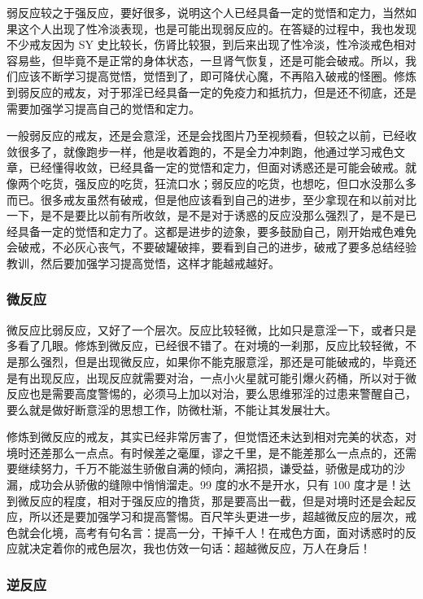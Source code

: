 \documentclass{ctexart}
\begin{document}
弱反应较之于强反应，要好很多，说明这个人已经具备一定的觉悟和定力，当然如果这个人出现了性冷淡表现，也是可能出现弱反应的。在答疑的过程中，我也发现不少戒友因为 SY 史比较长，伤肾比较狠，到后来出现了性冷淡，性冷淡戒色相对容易些，但毕竟不是正常的身体状态，一旦肾气恢复，还是可能会破戒。所以，我们应该不断学习提高觉悟，觉悟到了，即可降伏心魔，不再陷入破戒的怪圈。修炼到弱反应的戒友，对于邪淫已经具备一定的免疫力和抵抗力，但是还不彻底，还是需要加强学习提高自己的觉悟和定力。

一般弱反应的戒友，还是会意淫，还是会找图片乃至视频看，但较之以前，已经收敛很多了，就像跑步一样，他是收着跑的，不是全力冲刺跑，他通过学习戒色文章，已经懂得收敛，已经具备一定的觉悟和定力，但面对诱惑还是可能会破戒。就像两个吃货，强反应的吃货，狂流口水；弱反应的吃货，也想吃，但口水没那么多而已。很多戒友虽然有破戒，但是他应该看到自己的进步，至少拿现在和以前对比一下，是不是要比以前有所收敛，是不是对于诱惑的反应没那么强烈了，是不是已经具备一定的觉悟和定力了。这都是进步的迹象，要多鼓励自己，刚开始戒色难免会破戒，不必灰心丧气，不要破罐破摔，要看到自己的进步，破戒了要多总结经验教训，然后要加强学习提高觉悟，这样才能越戒越好。

\subsubsection{微反应}

微反应比弱反应，又好了一个层次。反应比较轻微，比如只是意淫一下，或者只是多看了几眼。修炼到微反应，已经很不错了。在对境的一刹那，反应比较轻微，不是那么强烈，但是出现微反应，如果你不能克服意淫，那还是可能破戒的，毕竟还是有出现反应，出现反应就需要对治，一点小火星就可能引爆火药桶，所以对于微反应也是需要高度警惕的，必须马上加以对治，要么思维邪淫的过患来警醒自己，要么就是做好断意淫的思想工作，防微杜渐，不能让其发展壮大。

修炼到微反应的戒友，其实已经非常厉害了，但觉悟还未达到相对完美的状态，对境时还差那么一点点。有时候差之毫厘，谬之千里，是不能差那么一点点的，还需要继续努力，千万不能滋生骄傲自满的倾向，满招损，谦受益，骄傲是成功的沙漏，成功会从骄傲的缝隙中悄悄溜走。99 度的水不是开水，只有 100 度才是！达到微反应的程度，相对于强反应的撸货，那是要高出一截，但是对境时还是会起反应，所以还是要加强学习和提高警惕。百尺竿头更进一步，超越微反应的层次，戒色就会化境，高考有句名言：提高一分，干掉千人！在戒色方面，面对诱惑时的反应就决定着你的戒色层次，我也仿效一句话：超越微反应，万人在身后！

\subsubsection{逆反应}
\end{document}
